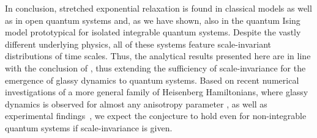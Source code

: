 \documentclass[aps,twocolumn,
superscriptaddress,
footinbib,
prl]{revtex4-1}
\begin{document}

In conclusion, stretched exponential relaxation is found in classical models as well as in open quantum systems and, as we have shown, also in the quantum Ising model prototypical for isolated integrable quantum systems. Despite the vastly different underlying physics, all of these systems feature scale-invariant distributions of time scales. %
Thus, the analytical results presented here are in line with the conclusion of \cite{Klafter1986OnSystems}, thus extending the sufficiency of scale-invariance for the emergence of glassy dynamics to quantum systems. Based on recent numerical investigations of a more general family of Heisenberg Hamiltonians, where glassy dynamics is observed for almost any anisotropy parameter \cite{schultzen2021semiclassical}, as well as experimental findings~\cite{Signoles2021GlassySystem}, we expect the conjecture to hold even for non-integrable quantum systems if scale-invariance is given.

\end{document}
